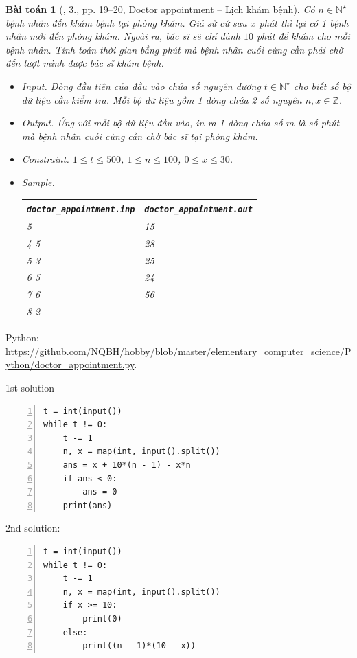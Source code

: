 \documentclass{article}
\newtheorem{baitoan}{Bài toán}
\begin{document}
\begin{baitoan}[\cite{Duc_200_BT_Python}, 3., pp. 19--20, Doctor appointment -- Lịch khám bệnh]
	Có $n\in\mathbb{N}^\star$ bệnh nhân đến khám bệnh tại phòng khám. Giả sử cứ sau $x$ phút thì lại có 1 bệnh nhân mới đến phòng khám. Ngoài ra, bác sĩ sẽ chỉ dành $10$ phút để khám cho mỗi bệnh nhân. Tính toán thời gian bằng phút mà bệnh nhân cuối cùng cần phải chờ đến lượt mình được bác sĩ khám bệnh.
	\begin{itemize}
		\item {\sf Input.} Dòng đầu tiên của đầu vào chứa số nguyên dương $t\in\mathbb{N}^\star$ cho biết số bộ dữ liệu cần kiểm tra. Mỗi bộ dữ liệu gồm 1 dòng chứa 2 số nguyên $n,x\in\mathbb{Z}$.
		\item {\sf Output.} Ứng với mỗi bộ dữ liệu đầu vào, in ra 1 dòng chứa số $m$ là số phút mà bệnh nhân cuối cùng cần chờ bác sĩ tại phòng khám.
		\item {\sf Constraint.} $1\le t\le500$, $1\le n\le100$, $0\le x\le30$.
		\item {\sf Sample.}
		\begin{table}[H]
			\centering
			\begin{tabular}{|l|l|}
				\hline
				\verb|doctor_appointment.inp| & \verb|doctor_appointment.out| \\
				\hline
				5 & 15 \\
				4 5 & 28 \\
				5 3 & 25 \\
				6 5 & 24 \\
				7 6 & 56 \\
				8 2 & \\
				\hline
			\end{tabular}
		\end{table}
	\end{itemize}
\end{baitoan}
\noindent Python: \url{https://github.com/NQBH/hobby/blob/master/elementary_computer_science/Python/doctor_appointment.py}.
\begin{multicols}{2}
	1st solution \cite[3., p. 203]{Duc_200_BT_Python}
\begin{Verbatim}[numbers=left,xleftmargin=5mm]
t = int(input())
while t != 0:
    t -= 1
    n, x = map(int, input().split())
    ans = x + 10*(n - 1) - x*n
    if ans < 0:
        ans = 0
    print(ans)
\end{Verbatim}
\columnbreak
	2nd solution:
\begin{Verbatim}[numbers=left,xleftmargin=5mm]
t = int(input())
while t != 0:
    t -= 1
    n, x = map(int, input().split())
    if x >= 10:
        print(0)
    else:
        print((n - 1)*(10 - x))
\end{Verbatim}
\end{multicols}
\end{document}

